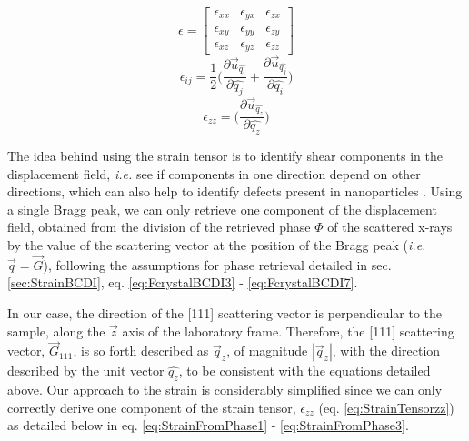\begin{multicols}{3}
    \begin{equation}
        \epsilon =
        \begin{bmatrix}
            \epsilon_{xx} & \epsilon_{yx} & \epsilon_{zx}\\
            \epsilon_{xy} & \epsilon_{yy} & \epsilon_{zy}\\
            \epsilon_{xz} & \epsilon_{yz} & \epsilon_{zz}
        \end{bmatrix}
        \label{eq:StrainTensor}
    \end{equation}
    \break
    \begin{equation}
      \epsilon_{ij} = \frac{1}{2}
        \Bigg(
        \frac{\partial \vec{u}_{\hat{q_i}}}{\partial \hat{q_j}}
        +
        \frac{\partial \vec{u}_{\hat{q_j}}}{\partial \hat{q_i}}
        \Bigg)
        \label{eq:StrainTensorIJ}
    \end{equation}
    \break
    \begin{equation}
      \epsilon_{zz} =
        \Bigg(
        \frac{\partial \vec{u}_{\hat{q_z}}}{\partial \hat{q_z}}
        \Bigg)
        \label{eq:StrainTensorzz}
    \end{equation}
\end{multicols}

The idea behind using the strain tensor is to identify shear components in the displacement field, \textit{i.e.} see if components in one direction depend on other directions, which can also help to identify defects present in nanoparticles \parencite{Lauraux2021}.
Using a single Bragg peak, we can only retrieve one component of the displacement field, obtained from the division of the retrieved phase $\Phi$ of the scattered x-rays by the value of the scattering vector at the position of the Bragg peak (\textit{i.e.} $\vec{q} = \vec{G}$), following the assumptions for phase retrieval detailed in sec. \ref{sec:StrainBCDI}, eq. \ref{eq:FcrystalBCDI3} - \ref{eq:FcrystalBCDI7}.

In our case, the direction of the [111] scattering vector is perpendicular to the sample, along the $\vec{z}$ axis of the laboratory frame.
Therefore, the [111] scattering vector, $\vec{G}_{111}$, is so forth described as $\vec{q}_z$, of magnitude  $|\vec{q}_z|$, with the direction described by the unit vector  $\hat{q_z}$, to be consistent with the equations detailed above.
Our approach to the strain is considerably simplified since we can only correctly derive one component of the strain tensor, $\epsilon_{zz}$ (eq. \ref{eq:StrainTensorzz}) as detailed below in eq. \ref{eq:StrainFromPhase1} - \ref{eq:StrainFromPhase3}.

